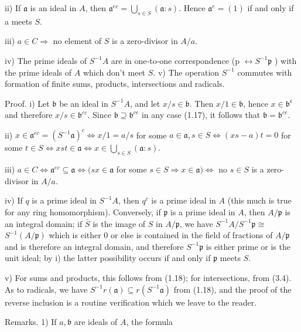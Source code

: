 \documentclass{standalone}
\theoremstyle{definition}
\theoremstyle{remark}
\begin{document}
ii) If $\mathfrak{a}$ is an ideal in $A$, then $\mathfrak{a}^{e c}=\bigcup_{s \in S}(\mathfrak{a}: s)$. Hence $\mathfrak{a}^{e}=(1)$ if and only if a meets $S$.

iii) $a \in C \Rightarrow$ no element of $S$ is a zero-divisor in $A / a$.

iv) The prime ideals of $S^{-1} A$ are in one-to-one correspondence (p $\leftrightarrow S^{-1} \mathfrak{p}$ ) with the prime ideals of $A$ which don't meet $S$. v) The operation $S^{-1}$ commutes with formation of finite sums, products, intersections and radicals.

Proof. i) Let $\mathfrak{b}$ be an ideal in $S^{-1} A$, and let $x / s \in \mathfrak{b}$. Then $x / 1 \in \mathfrak{b}$, hence $x \in \mathfrak{b}^{\mathfrak{c}}$ and therefore $x / s \in \mathfrak{b}^{c \varepsilon}$. Since $\mathfrak{b} \supseteq \mathfrak{b}^{c e}$ in any case (1.17), it follows that $\mathfrak{b}=\mathfrak{b}^{c e}$.

ii) $x \in \mathfrak{a}^{e c}=\left(S^{-1} \mathfrak{a}\right)^{c} \Leftrightarrow x / 1=a / s$ for some $a \in \mathfrak{a}, s \in S \Leftrightarrow(x s-a) t=0$ for some $t \in S \Leftrightarrow x s t \in \mathfrak{a} \Leftrightarrow x \in \bigcup_{s \in S}(\mathfrak{a}: s)$.

iii) $a \in C \Leftrightarrow \mathfrak{a}^{e c} \subseteq \mathfrak{a} \Leftrightarrow(s x \in \mathfrak{a}$ for some $s \in S \Rightarrow x \in \mathfrak{a}) \Leftrightarrow$ no $s \in S$ is a zero-divisor in $A / a$.

iv) If $q$ is a prime ideal in $S^{-1} A$, then $q^{c}$ is a prime ideal in $A$ (this much is true for any ring homomorphism). Conversely, if $\mathfrak{p}$ is a prime ideal in $A$, then $A / \mathfrak{p}$ is an integral domain; if $\bar{S}$ is the image of $S$ in $A / \mathfrak{p}$, we have $S^{-1} A / S^{-1} \mathfrak{p} \cong$ $S^{-1}(A / \mathfrak{p})$ which is either 0 or else is contained in the field of fractions of $A / \mathfrak{p}$ and is therefore an integral domain, and therefore $S^{-1} \mathfrak{p}$ is either prime or is the unit ideal; by i) the latter possibility occurs if and only if $\mathfrak{p}$ meets $S$.

v) For sums and products, this follows from (1.18); for intersections, from (3.4). As to radicals, we have $S^{-1} r(\mathfrak{a}) \subseteq r\left(S^{-1} \mathfrak{a}\right)$ from (1.18), and the proof of the reverse inclusion is a routine verification which we leave to the reader.

Remarks. 1) If $a, \mathfrak{b}$ are ideals of $A$, the formula
\end{document}
